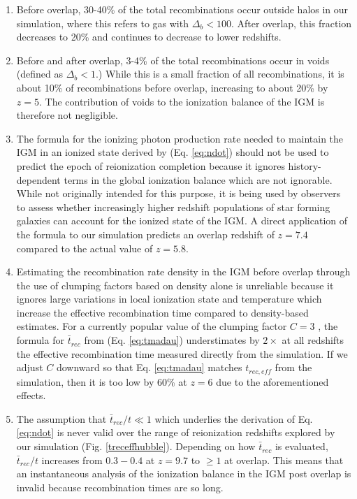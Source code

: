 \begin{enumerate}
\item
Before overlap, 30-40\% of the total recombinations occur outside halos in our simulation, where this refers to gas with $\Delta_b < 100$. After overlap, this fraction decreases to 20\% and continues to decrease to lower redshifts. 
\item
Before and after overlap, 3-4\% of the total recombinations occur in voids (defined as $\Delta_b < 1$.) While this is a small fraction of all recombinations, it is about 10\% of recombinations before overlap, increasing to about 20\% by $z=5$. The contribution of voids to the ionization balance of the IGM is therefore not negligible. 
\item
The formula for the ionizing photon production rate needed to maintain the IGM in an ionized state derived by \cite{MadauEtAl1999} (Eq. \ref{eq:ndot}) should not be used to predict the epoch of reionization completion because it ignores history-dependent terms in the global ionization balance which are not ignorable. While not originally intended for this purpose, it is being used by observers to assess whether increasingly higher redshift populations of star forming galaxies can account for the ionized state of the IGM. A direct application of the formula to our simulation predicts an overlap redshift of $z=7.4$ compared to the actual value of $z=5.8$. 
\item
Estimating the recombination rate density in the IGM before overlap through the use of clumping factors based on density alone is unreliable because it ignores large variations in local ionization state and temperature which increase the effective recombination time compared to density-based estimates. For a currently popular value of the clumping factor $C=3$ \citep{ShullEtAl2012}, the formula for $\bar{t}_{rec}$ from \cite{MadauEtAl1999}(Eq. \ref{eq:tmadau}) understimates by $2\times$ at all redshifts the effective recombination time measured directly from the simulation. If we adjust $C$ downward so that Eq. \ref{eq:tmadau} matches $t_{rec,eff}$ from the simulation, then it is too low by 60\% at $z=6$ due to the aforementioned effects. 
\item
The assumption that $\bar{t}_{rec}/t \ll 1$ which underlies the derivation of Eq. \ref{eq:ndot} is never valid over the range of reionization redshifts explored by our simulation (Fig. \ref{treceffhubble}). Depending on how $\bar{t}_{rec}$ is evaluated, $\bar{t}_{rec}/t$ increases from $0.3-0.4$ at $z=9.7$ to $\geq 1$ at overlap. This means that an instantaneous analysis of the ionization balance in the IGM post overlap is invalid because recombination times are so long. 

\end{enumerate}
